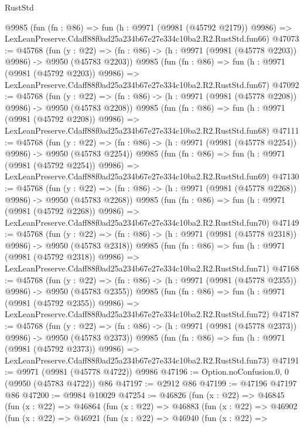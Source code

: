 \begin{lexlean}{RustStd}
\begin{coremodule}
    @9985
    (fun (fn : @86) =>
    fun (h : @9971 (@9981 (@45792 @2179)) @9986) =>
    LexLeanPreserve.Cdaff88f0ad25a234b67e27e334c10ba2.R2.RustStd.fun66)
@47073 := @45768
    (fun (y : @22) =>
    (fn : @86) -> (h : @9971 (@9981 (@45778 @2203)) @9986) -> @9950 (@45783 @2203))
    @9985
    (fun (fn : @86) =>
    fun (h : @9971 (@9981 (@45792 @2203)) @9986) =>
    LexLeanPreserve.Cdaff88f0ad25a234b67e27e334c10ba2.R2.RustStd.fun67)
@47092 := @45768
    (fun (y : @22) =>
    (fn : @86) -> (h : @9971 (@9981 (@45778 @2208)) @9986) -> @9950 (@45783 @2208))
    @9985
    (fun (fn : @86) =>
    fun (h : @9971 (@9981 (@45792 @2208)) @9986) =>
    LexLeanPreserve.Cdaff88f0ad25a234b67e27e334c10ba2.R2.RustStd.fun68)
@47111 := @45768
    (fun (y : @22) =>
    (fn : @86) -> (h : @9971 (@9981 (@45778 @2254)) @9986) -> @9950 (@45783 @2254))
    @9985
    (fun (fn : @86) =>
    fun (h : @9971 (@9981 (@45792 @2254)) @9986) =>
    LexLeanPreserve.Cdaff88f0ad25a234b67e27e334c10ba2.R2.RustStd.fun69)
@47130 := @45768
    (fun (y : @22) =>
    (fn : @86) -> (h : @9971 (@9981 (@45778 @2268)) @9986) -> @9950 (@45783 @2268))
    @9985
    (fun (fn : @86) =>
    fun (h : @9971 (@9981 (@45792 @2268)) @9986) =>
    LexLeanPreserve.Cdaff88f0ad25a234b67e27e334c10ba2.R2.RustStd.fun70)
@47149 := @45768
    (fun (y : @22) =>
    (fn : @86) -> (h : @9971 (@9981 (@45778 @2318)) @9986) -> @9950 (@45783 @2318))
    @9985
    (fun (fn : @86) =>
    fun (h : @9971 (@9981 (@45792 @2318)) @9986) =>
    LexLeanPreserve.Cdaff88f0ad25a234b67e27e334c10ba2.R2.RustStd.fun71)
@47168 := @45768
    (fun (y : @22) =>
    (fn : @86) -> (h : @9971 (@9981 (@45778 @2355)) @9986) -> @9950 (@45783 @2355))
    @9985
    (fun (fn : @86) =>
    fun (h : @9971 (@9981 (@45792 @2355)) @9986) =>
    LexLeanPreserve.Cdaff88f0ad25a234b67e27e334c10ba2.R2.RustStd.fun72)
@47187 := @45768
    (fun (y : @22) =>
    (fn : @86) -> (h : @9971 (@9981 (@45778 @2373)) @9986) -> @9950 (@45783 @2373))
    @9985
    (fun (fn : @86) =>
    fun (h : @9971 (@9981 (@45792 @2373)) @9986) =>
    LexLeanPreserve.Cdaff88f0ad25a234b67e27e334c10ba2.R2.RustStd.fun73)
@47191 := @9971 (@9981 (@45778 @4722)) @9986
@47196 := Option.noConfusion.{0, 0} (@9950 (@45783 @4722)) @86
@47197 := @2912 @86
@47199 := @47196 @47197 @86
@47200 := @9984 @10029
@47254 := @46826
    (fun (x : @22) =>
    @46845
      (fun (x : @22) =>
      @46864
        (fun (x : @22) =>
        @46883
          (fun (x : @22) =>
          @46902
            (fun (x : @22) =>
            @46921
              (fun (x : @22) =>
              @46940
                (fun (x : @22) =>

\end{coremodule}
\end{lexlean}
